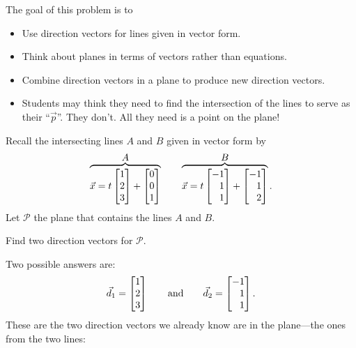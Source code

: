 \documentclass{workbook}
\newcommand{\displayonlynewpage}{\begin{displayonly}\newpage\end{displayonly}}
\newcommand{\bookonlynewpage}{\begin{bookonly}\newpage\end{bookonly}}
\begin{document}
\begin{slide}
	\displayonlynewpage
	\bookonlynewpage

	\question
	\begin{annotation}
		\begin{goals}

			The goal of this problem is to
			\begin{itemize}
				\item Use direction vectors for lines given in vector form.
				\item Think about planes in terms of vectors rather
					than equations.
				\item Combine direction vectors in a plane to produce new direction vectors.
			\end{itemize}
		\end{goals}

		\begin{notes}
			\begin{itemize}
				\item Students may think they need to find the intersection
					of the lines to serve as their ``$\vec p$''.
					They don't. All they need is a point
					on the plane!
			\end{itemize}
		\end{notes}
	\end{annotation}
	Recall the intersecting lines $A$ and $B$ given in vector form by
	\[
		\overbrace{\vec x=t\mat{1\\2\\3}+\mat{0\\0\\1}}^{\displaystyle A}
		\qquad
		\overbrace{\vec x=t\mat{-1\\1\\1}+\mat{-1\\1\\2}}^{\displaystyle B}.
	\]
	Let $\mathcal P$ the plane that contains the lines $A$ and $B$.
	\begin{parts}
		\item Find two direction vectors for $\mathcal P$.
			\begin{solution}
				Two possible answers are:
				\[
					\vec d_1 = \mat{1\\2\\3}
					\qquad \text{and} \qquad
					\vec d_2 = \mat{-1\\1\\1}.
				\]
				These are the two direction vectors we already know are in the
				plane---the ones from the two lines:


\end{solution}
\end{parts}
\end{slide}
\end{document}
